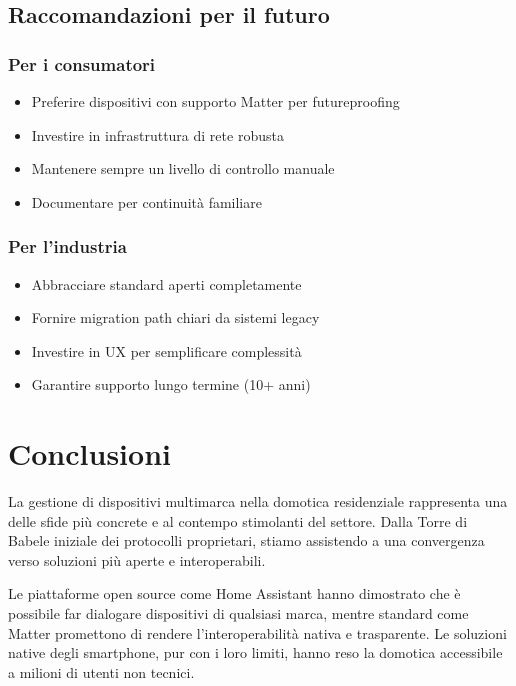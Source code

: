 \subsection{Raccomandazioni per il futuro}

\subsubsection{Per i consumatori}

\begin{itemize}
    \item Preferire dispositivi con supporto Matter per futureproofing
    \item Investire in infrastruttura di rete robusta
    \item Mantenere sempre un livello di controllo manuale
    \item Documentare per continuità familiare
\end{itemize}

\subsubsection{Per l'industria}

\begin{itemize}
    \item Abbracciare standard aperti completamente
    \item Fornire migration path chiari da sistemi legacy
    \item Investire in UX per semplificare complessità
    \item Garantire supporto lungo termine (10+ anni)
\end{itemize}

\section{Conclusioni}

La gestione di dispositivi multimarca nella domotica residenziale rappresenta una delle sfide più concrete e al contempo stimolanti del settore. Dalla Torre di Babele iniziale dei protocolli proprietari, stiamo assistendo a una convergenza verso soluzioni più aperte e interoperabili.

Le piattaforme open source come Home Assistant hanno dimostrato che è possibile far dialogare dispositivi di qualsiasi marca, mentre standard come Matter promettono di rendere l'interoperabilità nativa e trasparente. Le soluzioni native degli smartphone, pur con i loro limiti, hanno reso la domotica accessibile a milioni di utenti non tecnici.

